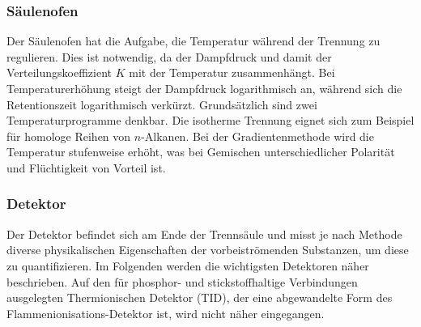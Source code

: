     \subsubsection{Säulenofen}
      
      Der Säulenofen hat die Aufgabe, die Temperatur während der Trennung zu regulieren. Dies ist notwendig, da der Dampfdruck und damit der Verteilungskoeffizient $K$ mit der Temperatur zusammenhängt. Bei Temperaturerhöhung steigt der Dampfdruck logarithmisch an, während sich die Retentionszeit logarithmisch verkürzt. Grundsätzlich sind zwei Temperaturprogramme denkbar. Die isotherme Trennung eignet sich zum Beispiel für homologe Reihen von $n$-Alkanen. Bei der Gradientenmethode wird die Temperatur stufenweise erhöht, was bei Gemischen unterschiedlicher Polarität und Flüchtigkeit von Vorteil ist. \citep[S. 168]{Taschenatlas}   
    
    \subsubsection{Detektor}
    
      Der Detektor befindet sich am Ende der Trennsäule und misst je nach Methode diverse physikalischen Eigenschaften der vorbeiströmenden Substanzen, um diese zu quantifizieren. Im Folgenden werden die wichtigsten Detektoren näher beschrieben. Auf den für phosphor- und stickstoffhaltige Verbindungen ausgelegten Thermionischen Detektor (TID), der eine abgewandelte Form des Flammenionisations-Detektor ist, wird nicht näher eingegangen.
      
